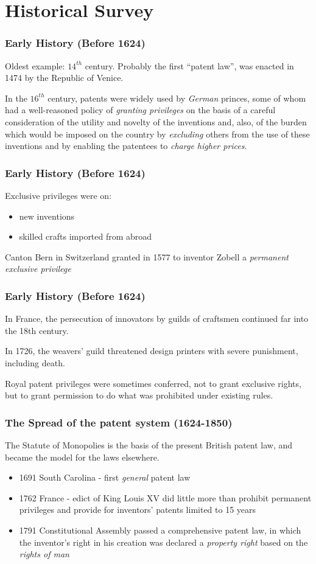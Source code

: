 
\setlength{\parskip}{\baselineskip} 
\section{Historical Survey}
\begin{frame}[t]
\frametitle{Early History (Before 1624)}

Oldest example: $14^{th}$ century. Probably the first “patent law”, was enacted in 1474 by the Republic of Venice.

In the $16^{th}$ century, patents were widely used by \textit{German} princes, some of whom had a well-reasoned policy of \textit{granting privileges} on the basis of a careful consideration of the utility and novelty of the inventions and, also, of the burden which would be imposed on the country by \textit{excluding} others from the use of these inventions and by enabling the patentees to \textit{charge higher prices}.

\end{frame}

\begin{frame}
\frametitle{Early History (Before 1624)}
Exclusive privileges were on:
\begin{itemize}
	\item new inventions
	\item skilled crafts imported from abroad
\end{itemize}

Canton Bern in Switzerland granted in 1577 to inventor Zobell a \textit{permanent exclusive privilege}
\end{frame}

\begin{frame}
\frametitle{Early History (Before 1624)}
In France, the persecution of innovators by guilds of craftsmen continued far into the
18th century. 

In 1726, the weavers' guild threatened design printers with severe punishment, including death.

Royal patent privileges were sometimes conferred, not to grant exclusive rights, but to grant permission to do what was prohibited under existing rules.
\end{frame}

\begin{frame}
\frametitle{The Spread of the patent system (1624-1850)}
The Statute of Monopolies is the basis of the present British patent law, and became the model for the laws elsewhere.
\begin{itemize}
	\item 1691 South Carolina - first \textit{general} patent law
	\item 1762 France - edict of King Louis XV did little more than prohibit permanent privileges and provide for inventors’ patents limited to 15 years
    \item 1791 Constitutional Assembly passed a comprehensive patent law, in which the inventor's right in his creation was declared a \textit{property right} based on the \textit{rights of man}
\end{itemize}
\end{frame}

